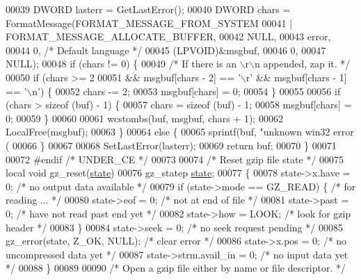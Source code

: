 \begin{DoxyCode}
00039     DWORD lasterr = GetLastError();
00040     DWORD chars = FormatMessage(FORMAT\_MESSAGE\_FROM\_SYSTEM
00041         | FORMAT\_MESSAGE\_ALLOCATE\_BUFFER,
00042         NULL,
00043         error,
00044         0, \textcolor{comment}{/* Default language */}
00045         (LPVOID)&msgbuf,
00046         0,
00047         NULL);
00048     \textcolor{keywordflow}{if} (chars != 0) \{
00049         \textcolor{comment}{/* If there is an \(\backslash\)r\(\backslash\)n appended, zap it.  */}
00050         \textcolor{keywordflow}{if} (chars >= 2
00051             && msgbuf[chars - 2] == \textcolor{charliteral}{'\(\backslash\)r'} && msgbuf[chars - 1] == \textcolor{charliteral}{'\(\backslash\)n'}) \{
00052             chars -= 2;
00053             msgbuf[chars] = 0;
00054         \}
00055 
00056         \textcolor{keywordflow}{if} (chars > \textcolor{keyword}{sizeof} (buf) - 1) \{
00057             chars = \textcolor{keyword}{sizeof} (buf) - 1;
00058             msgbuf[chars] = 0;
00059         \}
00060 
00061         wcstombs(buf, msgbuf, chars + 1);
00062         LocalFree(msgbuf);
00063     \}
00064     \textcolor{keywordflow}{else} \{
00065         sprintf(buf, \textcolor{stringliteral}{"unknown win32 error (%
00066     \}
00067 
00068     SetLastError(lasterr);
00069     \textcolor{keywordflow}{return} buf;
00070 \}
00071 
00072 \textcolor{preprocessor}{#endif }\textcolor{comment}{/* UNDER\_CE */}\textcolor{preprocessor}{}
00073 
00074 \textcolor{comment}{/* Reset gzip file state */}
00075 local \textcolor{keywordtype}{void} gz\_reset(\hyperlink{structstate}{state})
00076     gz\_statep \hyperlink{structstate}{state};
00077 \{
00078     state->x.have = 0;              \textcolor{comment}{/* no output data available */}
00079     \textcolor{keywordflow}{if} (state->mode == GZ\_READ) \{   \textcolor{comment}{/* for reading ... */}
00080         state->eof = 0;             \textcolor{comment}{/* not at end of file */}
00081         state->past = 0;            \textcolor{comment}{/* have not read past end yet */}
00082         state->how = LOOK;          \textcolor{comment}{/* look for gzip header */}
00083     \}
00084     state->seek = 0;                \textcolor{comment}{/* no seek request pending */}
00085     gz\_error(state, Z\_OK, NULL);    \textcolor{comment}{/* clear error */}
00086     state->x.pos = 0;               \textcolor{comment}{/* no uncompressed data yet */}
00087     state->strm.avail\_in = 0;       \textcolor{comment}{/* no input data yet */}
00088 \}
00089 
00090 \textcolor{comment}{/* Open a gzip file either by name or file descriptor. */}
}
\end{DoxyCode}
